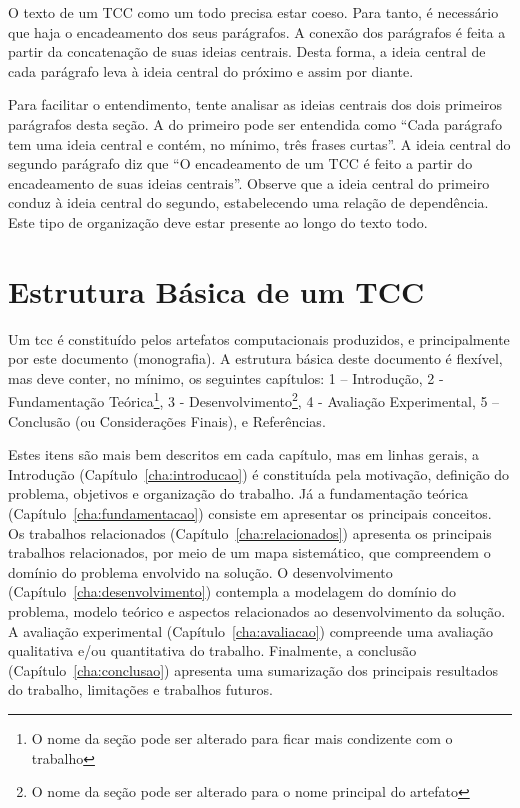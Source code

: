 \documentclass{eic-bcc-tcc}
\begin{document}
O texto de um TCC como um todo precisa estar coeso. Para tanto, é necessário que haja o encadeamento dos seus parágrafos. A conexão dos parágrafos é feita a partir da concatenação de suas ideias centrais. Desta forma, a ideia central de cada parágrafo leva à ideia central do próximo e assim por diante.

Para facilitar o entendimento, tente analisar as ideias centrais dos dois primeiros parágrafos desta seção. A do primeiro pode ser entendida como ``Cada parágrafo tem uma ideia central e contém, no mínimo, três frases curtas''. A ideia central do segundo parágrafo diz que ``O encadeamento de um TCC é feito a partir do encadeamento de suas ideias centrais''. Observe que a ideia central do primeiro conduz à ideia central do segundo, estabelecendo uma relação de dependência. Este tipo de organização deve estar presente ao longo do texto todo.

\section{Estrutura Básica de um TCC}

Um \gls{tcc} é constituído pelos artefatos computacionais produzidos, e principalmente por este documento (monografia). A estrutura básica deste documento é flexível, mas deve conter, no mínimo, os seguintes capítulos: 1 – Introdução, 2 - Fundamentação Teórica\footnote{O nome da seção pode ser alterado para ficar mais condizente com o trabalho}, 3 - Desenvolvimento\footnote{O nome da seção pode ser alterado para o nome principal do artefato}, 4 - Avaliação Experimental, 5 – Conclusão (ou Considerações Finais), e Referências.

Estes itens são mais bem descritos em cada capítulo, mas em linhas gerais, a Introdução (Capítulo~\ref{cha:introducao}) é constituída pela motivação, definição do problema, objetivos e organização do trabalho. Já a fundamentação teórica (Capítulo~\ref{cha:fundamentacao}) consiste em apresentar os principais conceitos. Os trabalhos relacionados (Capítulo~\ref{cha:relacionados}) apresenta os principais trabalhos relacionados, por meio de um mapa sistemático, que compreendem o domínio do problema envolvido na solução. O desenvolvimento (Capítulo~\ref{cha:desenvolvimento}) contempla a modelagem do domínio do problema, modelo teórico e aspectos relacionados ao desenvolvimento da solução. A avaliação experimental (Capítulo~\ref{cha:avaliacao}) compreende uma avaliação qualitativa e/ou quantitativa do trabalho. Finalmente, a conclusão (Capítulo~\ref{cha:conclusao}) apresenta uma sumarização dos principais resultados do trabalho, limitações e trabalhos futuros.
\end{document}
